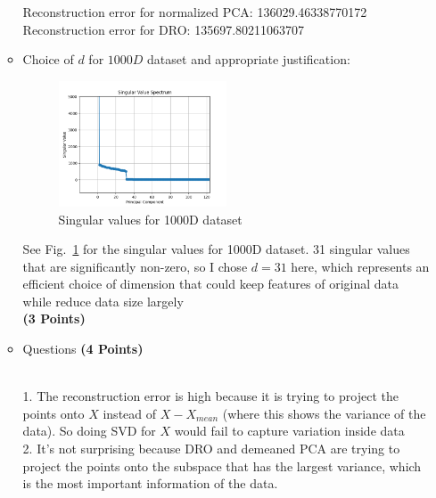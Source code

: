 \documentclass[a4paper]{article}
\theoremstyle{definition}
\newenvironment{soln}{
    \leavevmode\color{blue}\ignorespaces
}{}
\begin{document}
\begin{itemize}
\begin{itemize}
\begin{soln}
Reconstruction error for normalized PCA: 136029.46338770172\\
Reconstruction error for DRO: 135697.80211063707\\
\end{soln}
\item Choice of $d$ for $1000D$ dataset and appropriate justification:
\begin{figure}
\centering
\includegraphics[width=0.5\textwidth]{images/svd.png}
\caption{Singular values for 1000D dataset}
\label{fig:svd}
\end{figure}
\begin{soln}
See Fig.~\ref{fig:svd} for the singular values for 1000D dataset. 31 singular values that are significantly non-zero, so I chose $d = 31$ here, which represents an efficient choice of dimension that could keep features of original data while reduce data size largely\\
\end{soln}
\textbf{(3 Points)}
\item Questions \textbf{(4 Points)}
\begin{soln}
\\
1. The reconstruction error is high because it is trying to project the points onto $X$ instead of $X-X_{mean}$ (where this shows the variance of the data). So doing SVD for $X$ would fail to capture variation inside data\\
2. It's not surprising because DRO and demeaned PCA are trying to project the points onto the subspace that has the largest variance, which is the most important information of the data.\\

\end{soln}
\end{itemize}

\end{itemize}



\vspace{0.2in}
\end{document}
